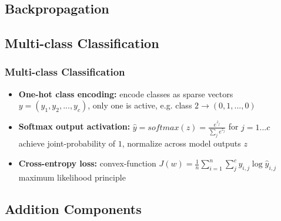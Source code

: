 \documentclass[aspectratio=169]{beamer}
\begin{document}
\subsection{Backpropagation}
\label{subsec:backpropagation}

\subsection{Multi-class Classification}
\label{subsec:multi-class-classification}

\begin{frame}
\frametitle{Multi-class Classification}

\begin{itemize}
    \item \textbf{One-hot class encoding:} encode classes as sparse vectors \\
    $y=(y_1, y_2, ..., y_c)$, only one is active, e.g. class $2\rightarrow (0, 1, ..., 0)$
    \item \textbf{Softmax output activation:} $\hat{y}=softmax(z)=\frac{e^{z_{j}}}{\sum_{j}e^{z_{j}}}$ for $j=1...c$\\
    achieve joint-probability of $1$, normalize across model outputs $z$
    \item \textbf{Cross-entropy loss:} convex-function $J(w)=\frac{1}{n}\sum_{i=1}^{n}\sum_{j}^{c}y_{i,j}\log\hat{y}_{i,j}$\\
    maximum likelihood principle
\end{itemize}
\end{frame}

\subsection{Addition Components}
\label{subsec:more-components}
\end{document}

